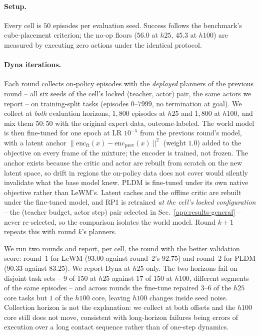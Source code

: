 
\paragraph{Setup.}
Every cell is $50$ episodes per evaluation seed. Success follows the benchmark's
cube-placement criterion; the no-op floors ($56.0$ at $h25$, $45.3$ at $h100$) are
measured by executing zero actions under the identical protocol.

\paragraph{Dyna iterations.}
Each round collects on-policy episodes with the \emph{deployed} planners of the previous
round -- all six seeds of the cell's locked (teacher, actor) pair, the same actors we
report -- on training-split tasks (episodes $0$--$7999$, no termination at goal). We
collect at \emph{both} evaluation horizons, $1{,}800$ episodes at $h25$ and $1{,}800$ at
$h100$, and mix them $50{:}50$ with the original expert data, outcome-labeled. The world
model is then fine-tuned for one epoch at LR $10^{-5}$ from the previous round's model,
with a latent anchor $\lVert \mathrm{enc}_{\mathrm{ft}}(x) - \mathrm{enc}_{\mathrm{prev}}(x)\rVert^2$
(weight $1.0$) added to the objective on every frame of the mixture; the encoder is
trained, not frozen. The anchor exists because the critic and actor are rebuilt from
scratch on the new latent space, so drift in regions the on-policy data does not cover
would silently invalidate what the base model knew. PLDM is fine-tuned under its own
native objective rather than LeWM's. Latent caches and the offline critic are rebuilt
under the fine-tuned model, and RP1 is retrained \emph{at the cell's locked
configuration} -- the (teacher budget, actor step) pair selected in
Sec.~\ref{app:results-general} -- never re-selected, so the comparison isolates the
world model. Round $k{+}1$ repeats this with round $k$'s planners.

We run two rounds and report, per cell, the round with the better validation score:
round~$1$ for LeWM ($93.00$ against round~2's $92.75$) and round~$2$ for PLDM ($90.33$
against $83.25$). We report Dyna at $h25$ only. The two horizons fail on disjoint task
sets -- $9$ of $150$ at $h25$ against $17$ of $150$ at $h100$, different segments of the
same episodes -- and across rounds the fine-tune repaired $3$--$6$ of the $h25$ core
tasks but $1$ of the $h100$ core, leaving $h100$ changes inside seed noise. Collection
horizon is not the explanation: we collect at both offsets and the $h100$ core still does
not move, consistent with long-horizon failures being errors of execution over a long
contact sequence rather than of one-step dynamics.

